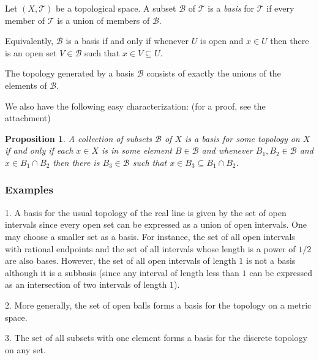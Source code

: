 \documentclass[12pt]{article}
\newtheorem*{proposition}{Proposition}
\begin{document}
Let $(X,\mathcal{T})$ be a topological space.  A subset $\mathcal{B}$ of 
$\mathcal{T}$ is a \emph{basis} for $\mathcal{T}$ if every member of $\mathcal{T}$ is a union of members of $\mathcal{B}$.

Equivalently, $\mathcal{B}$ is a basis if and only if whenever $U$ is open and $x\in U$ then there is an open set $V \in \mathcal{B}$ such that $x\in V\subseteq U$.

The topology generated by a basis $\mathcal{B}$ consists of exactly the unions of the elements of $\mathcal{B}$.

We also have the following easy characterization: (for a proof, see the attachment)

\begin{proposition}
A collection of subsets $\mathcal{B}$ of $X$ is a basis for some topology on $X$ if and only if each $x \in X$ is in some element $B \in \mathcal{B}$ and whenever $B_1, B_2\in\mathcal{B}$ and $x\in B_1\cap B_2$ then there is $B_3\in\mathcal{B}$ such that $x\in B_3\subseteq B_1\cap B_2$.
\end{proposition}

\subsubsection{Examples}

1. A basis for the usual topology of the real line is given by the set of open intervals since every open set can be expressed as a union of open intervals.  One may choose a smaller set as a basis.  For instance, the set of all open intervals with rational endpoints and the set of all intervals whose length is a power of $1/2$ are also bases.  However, the set of all open intervals of length $1$ is not a basis although it is a subbasis (since any interval of length less than $1$ can be expressed as an intersection of two intervals of length $1$).

2. More generally, the set of open balls forms a basis for the topology on a metric space.

3.  The set of all subsets with one element forms a basis for the discrete topology on any set.
\end{document}
